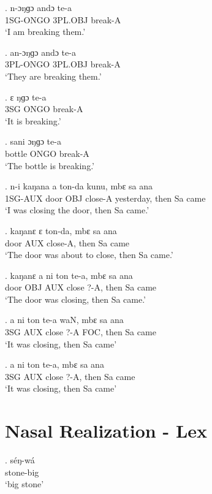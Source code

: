 \documentclass{assets/fieldnotes}
\begin{document}
\exg.
n-ɔŋɡɔ     andɔ      te-a    \\
1SG-ONGO   3PL.OBJ   break-A \\%
`I am breaking them.'

\exg.
an-ɔŋɡɔ    andɔ      te-a    \\
3PL-ONGO   3PL.OBJ   break-A \\%
`They are breaking them.'

\exg.
ɛ     ŋɡɔ    te-a    \\
3SG   ONGO   break-A \\%
`It is breaking.'

\exg.
sani     ɔŋɡɔ   te-a    \\
bottle   ONGO   break-A \\%
`The bottle is breaking.'

\exg.
n-i       kaŋana   a     ton-da    kunu,        mbɛ    sa   ana  \\
1SG-AUX   door     OBJ   close-A   yesterday,   then   Sa   came \\%
`I was closing the door, then Sa came.'

\exg.
kaŋanɛ   ɛ     ton-da,    mbɛ    sa   ana  \\
door     AUX   close-A,   then   Sa   came \\%
`The door was about to close, then Sa came.'

\exg.
kaŋanɛ   a     ni    ton     te-a,   mbɛ    sa   ana  \\
door     OBJ   AUX   close   ?-A,    then   Sa   came \\%
`The door was closing, then Sa came.'

\exg.
a     ni    ton     te-a   waN,   mbɛ    sa   ana  \\
3SG   AUX   close   ?-A    FOC,   then   Sa   came \\%
`It was closing, then Sa came'

\exg.
a     ni    ton     te-a,   mbɛ    sa   ana  \\
3SG   AUX   close   ?-A,    then   Sa   came \\%
`It was closing, then Sa came'


\section{Nasal Realization - Lex}


\exg. séŋ-wá\\
stone-big\\
`big stone'
\end{document}

